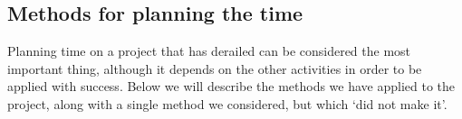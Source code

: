 \subsection{Methods for planning the time}
Planning time on a project that has derailed can be considered the most important thing, although it depends on the other activities in order to be applied with success.
Below we will describe the methods we have applied to the project, along with a single method we considered, but which `did not make it'.




